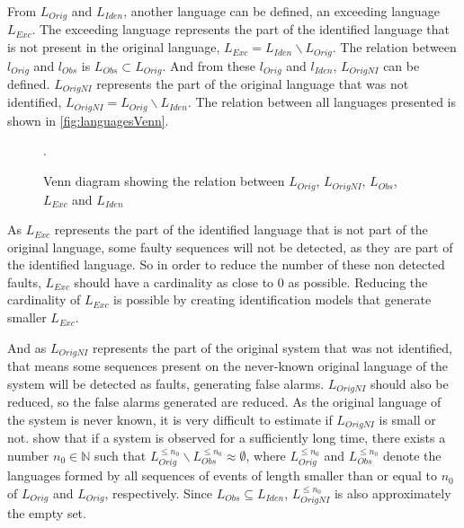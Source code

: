 From $L_{Orig}$ and $L_{Iden}$, another language can be defined, an exceeding
language $L_{Exc}$. The exceeding language represents the part of the identified language that is not present in the
original language, $L_{Exc}=L_{Iden}\backslash L_{Orig}$.  The
relation between $l_{Orig}$ and $l_{Obs}$ is $L_{Obs} \subset L_{Orig}$. And from
these $l_{Orig}$ and $l_{Iden}$, $L_{OrigNI}$ can be defined. $L_{OrigNI}$
represents the part of the
original language that was not identified, $L_{OrigNI}=L_{Orig}\backslash L_{Iden}$.
The relation between all languages presented is shown in \autoref{fig:languagesVenn}.

\usetikzlibrary{patterns}
\begin{figure}[H]
  \centering
  \begin{minipage}{1.1\wd0}
  \centering
  \caption{Venn diagram showing the relation between $L_{Orig}$, $L_{OrigNI}$,
    $L_{Obs}$, $L_{Exc}$ and $L_{Iden}$}.
  
  \label{fig:languagesVenn}
 \end{minipage}
\end{figure}
As $L_{Exc}$ represents the part of the identified language that is not part of
the original language, some faulty sequences will not be detected, as they are
part of the identified language. So in order to reduce the number of these non
detected faults, $L_{Exc}$ should have a cardinality as close to $0$ as 
possible. Reducing the cardinality of $L_{Exc}$ is possible by creating identification models that generate
smaller $L_{Exc}$.

And as $L_{OrigNI}$ represents the part of the original system that was not
identified, that means some sequences present on the never-known original language of the
system will be detected as faults, generating false alarms. $L_{OrigNI}$ should
also be reduced, so the false alarms generated are reduced. As the original
language of the system is never known, it is very difficult to estimate if
$L_{OrigNI}$ is small or not. \cite{klein2005fault} show that if a system is
observed for a sufficiently long time, there exists a number $n_0\in \mathbb{N}$
such that $L_{Orig}^{\leq n_0}\backslash L_{Obs}^{\leq n_0}\approx \emptyset$,
where $L_{Orig}^{\leq n_0}$ and $L_{Obs}^{\leq n_0}$ denote the languages formed
by all sequences of events of length smaller than or equal to $n_0$ of
$L_{Orig}$ and $L_{Orig}$, respectively. Since $L_{Obs}\subseteq L_{Iden}$, $L_{OrigNI}^{\leq
  n_0}$ is also approximately the empty set.

